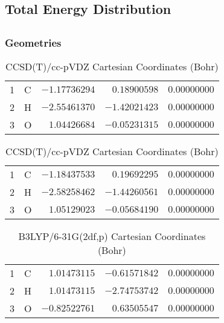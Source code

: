 \documentclass[10pt,oneside]{article}
\begin{document}
\begin{table}
\subsection*{Total Energy Distribution}
\centering\end{table}

\clearpage

\subsection{}

\begin{table}[h!]
\subsubsection*{Geometries}
\begin{multicols}{2}
\centering
\caption{CCSD(T)/cc-pVTZ Cartesian Coordinates (Bohr)}
\begin{tabular}{llrrr}
\toprule
1  & C  & $-1.17736294$ & $ 0.18900598$ & $ 0.00000000$ \\
2  & H  & $-2.55461370$ & $-1.42021423$ & $ 0.00000000$ \\
3  & O  & $ 1.04426684$ & $-0.05231315$ & $ 0.00000000$ \\
\bottomrule
\end{tabular}
\caption{CCSD(T)/cc-pVDZ Cartesian Coordinates (Bohr)}
\begin{tabular}{llrrr}
\toprule
1  & C  & $-1.18437533$ & $ 0.19692295$ & $ 0.00000000$ \\
2  & H  & $-2.58258462$ & $-1.44260561$ & $ 0.00000000$ \\
3  & O  & $ 1.05129023$ & $-0.05684190$ & $ 0.00000000$ \\
\bottomrule
\end{tabular}
\end{multicols}
\end{table}

\begin{table}[h]
\centering
\caption{B3LYP/6-31G(2df,p) Cartesian Coordinates (Bohr)}
\begin{tabular}{llrrr}
\toprule
1  & C  & $ 1.01473115$ & $-0.61571842$ & $ 0.00000000$ \\
2  & H  & $ 1.01473115$ & $-2.74753742$ & $ 0.00000000$ \\
3  & O  & $-0.82522761$ & $ 0.63505547$ & $ 0.00000000$ \\
\bottomrule
\end{tabular}
\end{table}
\end{document}
